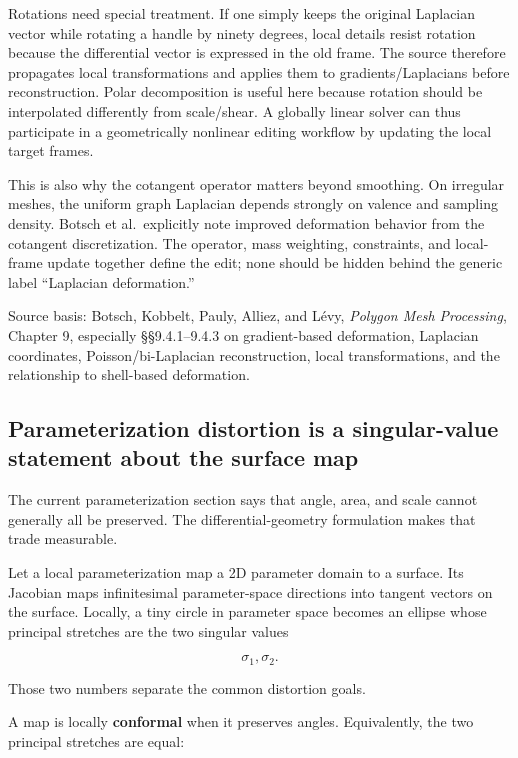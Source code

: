 Rotations need special treatment. If one simply keeps the original Laplacian vector while rotating a handle by ninety degrees, local details resist rotation because the differential vector is expressed in the old frame. The source therefore propagates local transformations and applies them to gradients/Laplacians before reconstruction. Polar decomposition is useful here because rotation should be interpolated differently from scale/shear. A globally linear solver can thus participate in a geometrically nonlinear editing workflow by updating the local target frames.

This is also why the cotangent operator matters beyond smoothing. On irregular meshes, the uniform graph Laplacian depends strongly on valence and sampling density. Botsch et al.~explicitly note improved deformation behavior from the cotangent discretization. The operator, mass weighting, constraints, and local-frame update together define the edit; none should be hidden behind the generic label ``Laplacian deformation.''

Source basis: Botsch, Kobbelt, Pauly, Alliez, and Lévy, \emph{Polygon Mesh Processing}, Chapter 9, especially §§9.4.1--9.4.3 on gradient-based deformation, Laplacian coordinates, Poisson/bi-Laplacian reconstruction, local transformations, and the relationship to shell-based deformation.

\subsection{Parameterization distortion is a singular-value statement about the surface map}\label{03-visual-computing-i-ch002-parameterization-distortion-is-a-singular-value-statement-about-the-surface-map}

The current parameterization section says that angle, area, and scale cannot generally all be preserved. The differential-geometry formulation makes that trade measurable.

Let a local parameterization map a 2D parameter domain to a surface. Its Jacobian maps infinitesimal parameter-space directions into tangent vectors on the surface. Locally, a tiny circle in parameter space becomes an ellipse whose principal stretches are the two singular values

\[
\sigma_1,\sigma_2.
\]

Those two numbers separate the common distortion goals.

A map is locally \textbf{conformal} when it preserves angles. Equivalently, the two principal stretches are equal:

